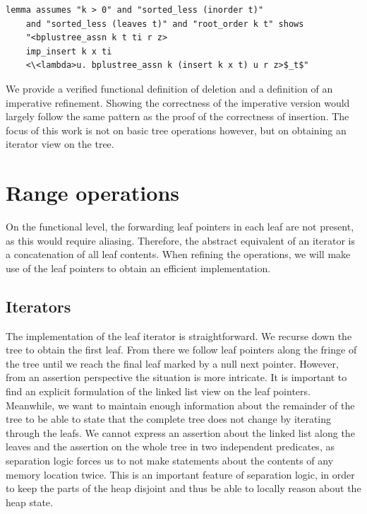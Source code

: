 \documentclass[a4paper,UKenglish,cleveref, autoref, thm-restate]{lipics-v2021}
\begin{document}
\begin{lstlisting}[mathescape=true, language=Isabelle,label=lst:insert-refines]
lemma assumes "k > 0" and "sorted_less (inorder t)"
    and "sorted_less (leaves t)" and "root_order k t" shows
    "<bplustree_assn k t ti r z>
    imp_insert k x ti
    <\<lambda>u. bplustree_assn k (insert k x t) u r z>$_t$"
\end{lstlisting}
  

We provide a verified functional definition of deletion and a definition of an imperative refinement.
Showing the correctness of the imperative version would largely follow
the same pattern as the proof of the correctness of insertion.
The focus of this work is not on basic tree operations
however, but on obtaining an iterator view on the tree.


\section{Range operations}
\label{sec:range}

On the functional level, the forwarding leaf pointers in each leaf
are not present, as this would require aliasing.
Therefore, the abstract equivalent of an iterator
is a concatenation of all leaf contents.
When refining the operations, we will make use of the leaf pointers
to obtain an efficient implementation.

\subsection{Iterators}
\label{sec:imperative_iter}

The implementation of the leaf iterator is straightforward.
We recurse down the tree to obtain the first leaf.
From there we follow leaf
pointers along the fringe of the tree until we reach the final leaf marked by a null next pointer.
However, from an assertion perspective the situation is more intricate.
It is important to find an explicit formulation of the linked list view on the leaf pointers.
Meanwhile, we want to maintain enough information about the remainder of the tree
to be able to state that the complete tree does not change by iterating through the leafs.
We cannot express an assertion about the linked list along the leaves
and the assertion on the whole tree in two independent predicates,
as separation logic forces us to not make statements about the contents of
any memory location twice.
This is an important feature of separation logic,
in order to keep the parts of the heap disjoint and
thus be able to locally reason about the heap state.
\end{document}
